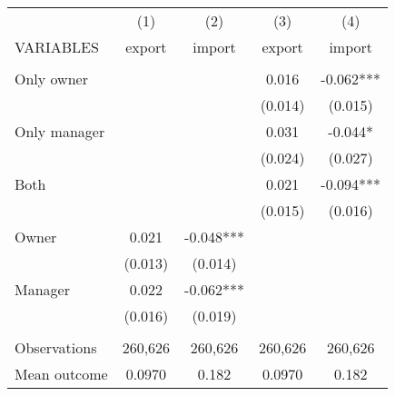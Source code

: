 \begin{tabular}{lcccc} \hline
 & (1) & (2) & (3) & (4) \\
VARIABLES & export & import & export & import \\ \hline
 &  &  &  &  \\
Only owner &  &  & 0.016 & -0.062*** \\
 &  &  & (0.014) & (0.015) \\
Only manager &  &  & 0.031 & -0.044* \\
 &  &  & (0.024) & (0.027) \\
Both &  &  & 0.021 & -0.094*** \\
 &  &  & (0.015) & (0.016) \\
Owner & 0.021 & -0.048*** &  &  \\
 & (0.013) & (0.014) &  &  \\
Manager & 0.022 & -0.062*** &  &  \\
 & (0.016) & (0.019) &  &  \\
 &  &  &  &  \\
Observations & 260,626 & 260,626 & 260,626 & 260,626 \\
 Mean outcome & 0.0970 & 0.182 & 0.0970 & 0.182 \\ \hline
\end{tabular}
